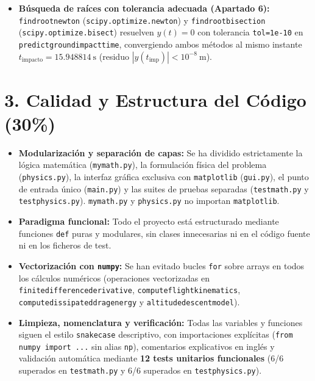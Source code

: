 \documentclass[10pt, a4paper]{article}
\renewcommand{\_}{\textunderscore\allowbreak}
\begin{document}
\begin{itemize}
    \item \textbf{Búsqueda de raíces con tolerancia adecuada (Apartado 6):} \texttt{find\_root\_newton} (\texttt{scipy.optimize.newton}) y \texttt{find\_root\_bisection} (\texttt{scipy.optimize.bisect}) resuelven $y(t) = 0$ con tolerancia \texttt{tol=1e-10} en \texttt{predict\_ground\_impact\_time}, convergiendo ambos métodos al mismo instante $t_{\text{impacto}} = 15.948814\ \mathrm{s}$ (residuo $|y(t_{\text{imp}})| < 10^{-8}\ \mathrm{m}$).
\end{itemize}

\section*{3. Calidad y Estructura del Código (30\%)}

\begin{itemize}
    \item \textbf{Modularización y separación de capas:} Se ha dividido estrictamente la lógica matemática (\texttt{my\_math.py}), la formulación física del problema (\texttt{physics.py}), la interfaz gráfica exclusiva con \texttt{matplotlib} (\texttt{gui.py}), el punto de entrada único (\texttt{main.py}) y las suites de pruebas separadas (\texttt{test\_math.py} y \texttt{test\_physics.py}). \texttt{my\_math.py} y \texttt{physics.py} no importan \texttt{matplotlib}.
    \item \textbf{Paradigma funcional:} Todo el proyecto está estructurado mediante funciones \texttt{def} puras y modulares, sin clases innecesarias ni en el código fuente ni en los ficheros de test.
    \item \textbf{Vectorización con \texttt{numpy}:} Se han evitado bucles \texttt{for} sobre arrays en todos los cálculos numéricos (operaciones vectorizadas en \texttt{finite\_difference\_derivative}, \texttt{compute\_flight\_kinematics}, \texttt{compute\_dissipated\_drag\_energy} y \texttt{altitude\_descent\_model}).
    \item \textbf{Limpieza, nomenclatura y verificación:} Todas las variables y funciones siguen el estilo \texttt{snake\_case} descriptivo, con importaciones explícitas (\texttt{from numpy import ...} sin alias \texttt{np}), comentarios explicativos en inglés y validación automática mediante \textbf{12 tests unitarios funcionales} (6/6 superados en \texttt{test\_math.py} y 6/6 superados en \texttt{test\_physics.py}).
\end{itemize}
\end{document}
